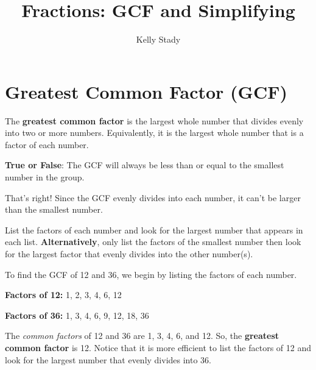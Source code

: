 \documentclass{ximera}[font=12pt]  %
\title{Fractions: GCF and Simplifying}   %
\author{Kelly Stady}
\begin{document}
\begin{abstract}

\end{abstract}

\maketitle

\label{xim:FracsGCFSimplify}


\section*{Greatest Common Factor (GCF)}

\begin{definition}
The \textbf{greatest common factor} is the largest whole number that divides evenly into two or more numbers.  Equivalently, it is
the largest whole number that is a factor of each number.

\end{definition}


\begin{problem} \textcolor{glaucous!55!black}{\textbf{True or False}}:  The GCF will always be less than or equal to the smallest number in the group.

\begin{multipleChoice}
\end{multipleChoice}

\begin{feedback}[correct]
That's right!  Since the GCF evenly divides into each number, it can't be larger than the smallest number.
\end{feedback}

\end{problem}



\begin{procedure}

List the factors of each number and look for the largest number that appears in each list.  \textbf{Alternatively}, 
only list the factors of the smallest number then look for the largest factor that evenly divides into the other number(s).

\end{procedure}


\begin{example}

To find the GCF of 12 and 36, we begin by listing the factors of each number.


\qquad \textbf{Factors of 12:} 1, 2, 3, 4, 6, 12

\qquad \textbf{Factors of 36:} 1, 3, 4, 6, 9, 12, 18, 36


The \textit{common factors} of 12 and 36 are 1, 3, 4, 6, and 12.  So, the \textbf{greatest common factor} is 12.  
Notice that it is more efficient to list the factors of 12 and look for the largest number that evenly divides into 36.  

\end{example}
\end{document}

